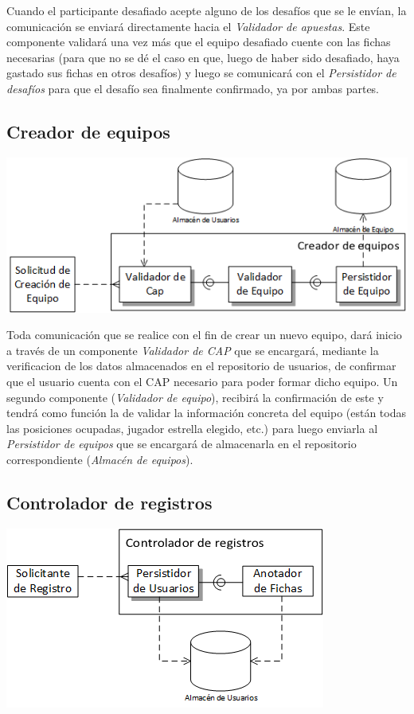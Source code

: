 Cuando el participante desafiado acepte alguno de los desafíos que se le envían, la comunicación se enviará directamente hacia el \emph{Validador de apuestas}. Este componente validará una vez más que el equipo desafiado cuente con las fichas necesarias (para que no se dé el caso en que, luego de haber sido desafiado, haya gastado sus fichas en otros desafíos) y luego se comunicará con el \emph{Persistidor de desafíos} para que el desafío sea finalmente confirmado, ya por ambas partes.

\subsection{Creador de equipos}
\begin{center}
\includegraphics[scale=0.80]{diagramas/tp1/equipo.png}
\end{center}
\label{fig:equipo}

Toda comunicación que se realice con el fin de crear un nuevo equipo, dará inicio a través de un componente \emph{Validador de CAP} que se encargará, mediante la verificacion de los datos almacenados en el repositorio de usuarios, de confirmar que el usuario cuenta con el CAP necesario para poder formar dicho equipo. Un segundo componente (\emph{Validador de equipo}), recibirá la confirmación de este y tendrá como función la de validar la información concreta del equipo (están todas las posiciones ocupadas, jugador estrella elegido, etc.) para luego enviarla al \emph{Persistidor de equipos} que se encargará de almacenarla en el repositorio correspondiente (\emph{Almacén de equipos}).

\subsection{Controlador de registros}
\begin{center}
\includegraphics[scale=0.80]{diagramas/tp1/registros.png}
\end{center}
\label{fig:registros}


